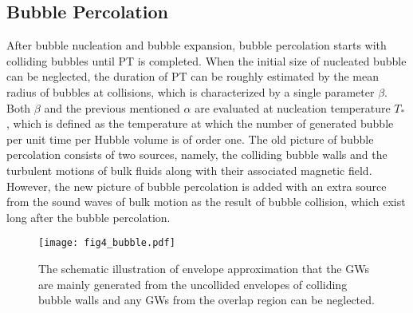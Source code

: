 \documentclass[a4paper,11pt]{article}
\begin{document}
\subsection{Bubble Percolation}
\label{subsec:bubble percolation}

After bubble nucleation and bubble expansion, bubble percolation starts with colliding bubbles until PT is completed. When the initial size of nucleated bubble can be neglected, the duration of PT can be roughly estimated by the mean radius of bubbles at collisions, which is characterized by a single parameter $\beta$. Both $\beta$ and the previous mentioned $\alpha$ are evaluated at nucleation temperature $T_*$, which is defined as the temperature at which the number of generated bubble per unit time per Hubble volume is of order one. The old picture of bubble percolation consists of two sources, namely, the colliding bubble walls and the turbulent motions of bulk fluids along with their associated magnetic field. However, the new picture of bubble percolation is added with an extra source from the sound waves of bulk motion as the result of bubble collision, which exist long after the bubble percolation.
\begin{figure}
  \centering
  \texttt{[image: fig4\_bubble.pdf]}
  \caption{The schematic illustration of envelope approximation that the GWs are mainly generated from the uncollided envelopes of colliding bubble walls and any GWs from the overlap region can be neglected.}
  \label{fig:bubble}
\end{figure}
\end{document}
